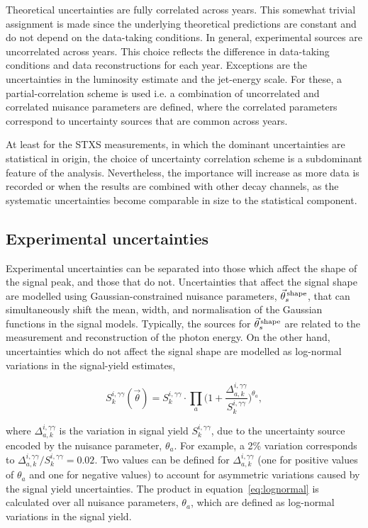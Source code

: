 Theoretical uncertainties are fully correlated across years. This somewhat trivial assignment is made since the underlying theoretical predictions are constant and do not depend on the data-taking conditions. In general, experimental sources are uncorrelated across years. This choice reflects the difference in data-taking conditions and data reconstructions for each year. Exceptions are the uncertainties in the luminosity estimate and the jet-energy scale. For these, a partial-correlation scheme is used i.e. a combination of uncorrelated and correlated nuisance parameters are defined, where the correlated parameters correspond to uncertainty sources that are common across years.

At least for the STXS measurements, in which the dominant uncertainties are statistical in origin, the choice of uncertainty correlation scheme is a subdominant feature of the analysis. Nevertheless, the importance will increase as more data is recorded or when the results are combined with other decay channels, as the systematic uncertainties become comparable in size to the statistical component.

\subsection{Experimental uncertainties}\label{sec:systematics_experimental}
Experimental uncertainties can be separated into those which affect the shape of the signal \mgg peak, and those that do not. Uncertainties that affect the signal shape are modelled using Gaussian-constrained nuisance parameters, $\vec{\theta}^{\,\rm{shape}}_{s}$, that can simultaneously shift the mean, width, and normalisation of the Gaussian functions in the signal models. Typically, the sources for $\vec{\theta}^{\,\rm{shape}}_{s}$ are related to the measurement and reconstruction of the photon energy. On the other hand, uncertainties which do not affect the signal shape are modelled as log-normal variations in the signal-yield estimates,

\begin{equation}\label{eq:lognormal}
    S^{i,\gamma\gamma}_k(\vec{\theta}) = S^{i,\gamma\gamma}_k \cdot \prod_a \Big( 1+\frac{\Delta^{i,\gamma\gamma}_{a,k}}{S^{i,\gamma\gamma}_k} \Big)^{\theta_a},
\end{equation}

\noindent
where $\Delta^{i,\gamma\gamma}_{a,k}$ is the variation in signal yield $S^{i,\gamma\gamma}_k$, due to the uncertainty source encoded by the nuisance parameter, $\theta_a$. For example, a 2\% variation corresponds to ${\Delta^{i,\gamma\gamma}_{a,k}/S^{i,\gamma\gamma}_k=0.02}$. Two values can be defined for $\Delta^{i,\gamma\gamma}_{a,k}$ (one for positive values of $\theta_a$ and one for negative values) to account for asymmetric variations caused by the signal yield uncertainties. The product in equation~\ref{eq:lognormal} is calculated over all nuisance parameters, $\theta_a$, which are defined as log-normal variations in the signal yield.

